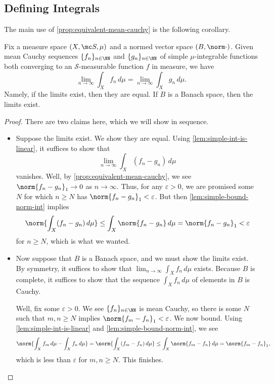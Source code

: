 \documentclass[../notes.tex]{subfiles}
\begin{document}
\subsection{Defining Integrals}
The main use of \autoref{prop:equivalent-mean-cauchy} is the following corollary.
\begin{corollary} \label{cor:int-is-well-defined}
	Fix a measure space $(X,\mc S,\mu)$ and a normed vector space $(B,\norm\cdot)$. Given mean Cauchy sequences $\{f_n\}_{n\in\NN}$ and $\{g_n\}_{n\in\NN}$ of simple $\mu$-integrable functions both converging to an $\mathcal S$-measurable function $f$ in measure, we have
	\[\lim_{n\to\infty}\int_Xf_n\,d\mu=\lim_{n\to\infty}\int_Xg_n\,d\mu.\]
	Namely, if the limits exist, then they are equal. If $B$ is a Banach space, then the limits exist.
\end{corollary}
\begin{proof}
	There are two claims here, which we will show in sequence.
	\begin{itemize}
		\item Suppose the limits exist. We show they are equal. Using \autoref{lem:simple-int-is-linear}, it suffices to show that
		\[\lim_{n\to\infty}\int_X(f_n-g_n)\,d\mu\]
		vanishes. Well, by \autoref{prop:equivalent-mean-cauchy}, we see $\norm{f_n-g_n}_1\to0$ as $n\to\infty$. Thus, for any $\varepsilon>0$, we are promised some $N$ for which $n\ge N$ has $\norm{f_n-g_n}_1<\varepsilon$. But then \autoref{lem:simple-bound-norm-int} implies
		\[\norm{\int_X(f_n-g_n)\,d\mu}\le\int_X\norm{f_n-g_n}\,d\mu=\norm{f_n-g_n}_1<\varepsilon\]
		for $n\ge N$, which is what we wanted.

		\item Now suppose that $B$ is a Banach space, and we must show the limits exist. By symmetry, it suffices to show that $\lim_{n\to\infty}\int_Xf_n\,d\mu$ exists. Because $B$ is complete, it suffices to show that the sequence $\int_Xf_n\,d\mu$ of elements in $B$ is Cauchy.

		Well, fix some $\varepsilon>0$. We see $\{f_n\}_{n\in\NN}$ is mean Cauchy, so there is some $N$ such that $m,n\ge N$ implies $\norm{f_m-f_n}_1<\varepsilon$. We now bound. Using \autoref{lem:simple-int-is-linear} and \autoref{lem:simple-bound-norm-int}, we see
		\[\norm{\int_Xf_m\,d\mu-\int_Xf_n\,d\mu}=\norm{\int_X(f_m-f_n)\,d\mu}\le\int_X\norm{f_m-f_n}\,d\mu=\norm{f_m-f_n}_1,\]
		which is less than $\varepsilon$ for $m,n\ge N$. This finishes.
		\qedhere
	\end{itemize} 
\end{proof}
\end{document}
